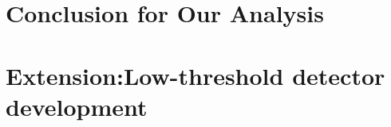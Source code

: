 \chapter{Conclusion for Our Analysis}

\chapter{Extension:Low-threshold detector development}

\begin{comment}
\section{\label{sec:level1}Introduction:\protect\\
Why GeIA? and The issue}

For the exploration of the lower-mass region for WIMPs, the first immediate idea is "Since the signal of WIMP is so small, why don't we just amplify it?" Some people commenced their contemplation on the technical works.\\

In 2000, two smart Russian guys came up with the brilliant idea about applying the high voltage on the Ge detector, and the signal will be amplified by the avalanche region emerging in the crystal under the high voltage. Now, there are a bunch of experiments trying to extend the idea and to see whether it can be worked out with the more state-of-the-art technique.\\ 

Although the internal amplification seems a good idea, the noise of the crystal could be unexpectedly amplified as well. Dealing with the issue of the high noise originating from the leakage current is another topic for this experiment. In this document, we will also confirm the issue of the noise in the crystal.\\

In our collaborations, we have two teams working on the idea under two conventional temperatures, which are 4K(USD) and 77K(THU). I would like to explore that under these two temperatures, what will happen to the crystal from the perspective of "the signal" and also "the noise" under the high voltage.



\end{comment}
